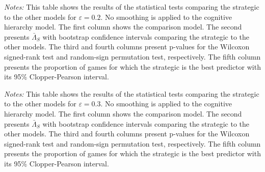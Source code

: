 \begin{table}[h!]
\begin{center}
\caption{Statistical tests comparing optimized vs other models ($\varepsilon = 0.2$)} \label{tab:stat_bounds_20}
\scriptsize

\end{center}
\begin{footnotesize}
\begin{singlespace}
\vspace*{-0.05in}
\emph{Notes:} This table shows the results of the statistical tests comparing the strategic  to the other models for $\varepsilon = 0.2$.
No smoothing is applied to the cognitive hierarchy model.
The first column shows the comparison model.
The second presents $\bar \Lambda_S$ with bootstrap confidence intervals comparing the strategic  to the other models.
The third and fourth columns present p-values for the Wilcoxon signed-rank test and random-sign permutation test, respectively.
The fifth column presents the proportion of games for which the strategic  is the best predictor with its 95\% Clopper-Pearson interval. \starlanguage
\end{singlespace}
\end{footnotesize}
\end{table}

\begin{table}[h!]
\begin{center}
\caption{Statistical tests comparing optimized vs other models ($\varepsilon = 0.3$)} \label{tab:stat_bounds_30}
\scriptsize

\end{center}
\begin{footnotesize}
\begin{singlespace}
\vspace*{-0.05in}
\emph{Notes:} This table shows the results of the statistical tests comparing the strategic  to the other models for $\varepsilon = 0.3$.
No smoothing is applied to the cognitive hierarchy model.
The first column shows the comparison model.
The second presents $\bar \Lambda_S$ with bootstrap confidence intervals comparing the strategic  to the other models.
The third and fourth columns present p-values for the Wilcoxon signed-rank test and random-sign permutation test, respectively.
The fifth column presents the proportion of games for which the strategic  is the best predictor with its 95\% Clopper-Pearson interval. \starlanguage
\end{singlespace}
\end{footnotesize}
\end{table}


